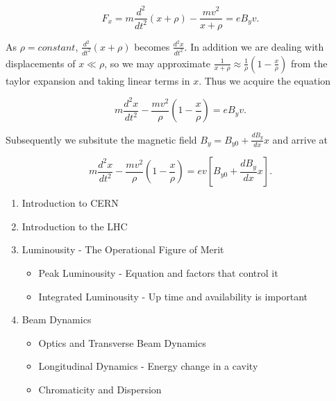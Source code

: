 \begin{equation}
F_{x} = m\frac{d^{2}}{dt^{2}} \left( x+ \rho \right) - \frac{mv^{2}}{x + \rho} = eB_{y} v.
\end{equation}

As $\rho = constant$, $\frac{d^{2}}{dt^{2}} ( x+ \rho )$ becomes $\frac{d^{2}x}{dt^{2}}$. In addition we are dealing with displacements of $x \ll \rho$, so we may approximate $\frac{1}{x+\rho} \approx \frac{1}{\rho}(1-\frac{x}{\rho})$ from the taylor expansion and taking linear terms in $x$. Thus we acquire the equation

\begin{equation}
 m\frac{d^{2}x}{dt^{2}}  - \frac{mv^{2}}{\rho}\left( 1 - \frac{x}{\rho} \right) = eB_{y} v.
\end{equation}

Subsequently we subsitute the magnetic field $B_{y} = B_{y0} + \frac{dB_{y}}{dx} x$ and arrive at

\begin{equation}
 m\frac{d^{2}x}{dt^{2}}  - \frac{mv^{2}}{\rho}\left( 1 - \frac{x}{\rho} \right) = e v \left[ B_{y0} + \frac{dB_{y}}{dx} x \right].
\end{equation}


\begin{enumerate}
\item{Introduction to CERN}
\item{Introduction to the LHC}
\item{Luminousity - The Operational Figure of Merit}
\begin{itemize}
\item{Peak Luminousity - Equation and factors that control it}
\item{Integrated Luminousity - Up time and availability is important}
\end{itemize}
\item{Beam Dynamics}
\begin{itemize}
\item{Optics and Transverse Beam Dynamics}
\item{Longitudinal Dynamics - Energy change in a cavity}
\item{Chromaticity and Dispersion}
\end{itemize}
\end{enumerate}
